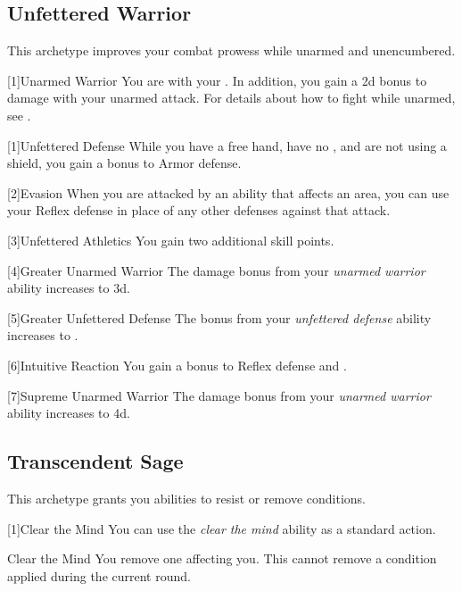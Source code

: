     \subsection{Unfettered Warrior}\label{Unfettered Warrior}
        This archetype improves your combat prowess while unarmed and unencumbered.

        [1]{Unarmed Warrior}
        You are  with your .
        In addition, you gain a \plus2d bonus to damage with your unarmed attack.
        For details about how to fight while unarmed, see .

        [1]{Unfettered Defense}
        While you have a free hand, have no , and are not using a shield, you gain a  bonus to Armor defense.

        [2]{Evasion} When you are attacked by an ability that affects an area, you can use your Reflex defense in place of any other defenses against that attack.

        [3]{Unfettered Athletics} You gain two additional skill points.

        [4]{Greater Unarmed Warrior} The damage bonus from your \textit{unarmed warrior} ability increases to \plus3d.

        [5]{Greater Unfettered Defense}
        The bonus from your \textit{unfettered defense} ability increases to .

        [6]{Intuitive Reaction}
        You gain a  bonus to Reflex defense and .

        [7]{Supreme Unarmed Warrior} The damage bonus from your \textit{unarmed warrior} ability increases to \plus4d.

    \subsection{Transcendent Sage}
        This archetype grants you abilities to resist or remove conditions.

        [1]{Clear the Mind} You can use the \textit{clear the mind} ability as a standard action.
        \begin{freeability}{Clear the Mind}
            You remove one  affecting you.
            This cannot remove a condition applied during the current round.
        \end{freeability}

